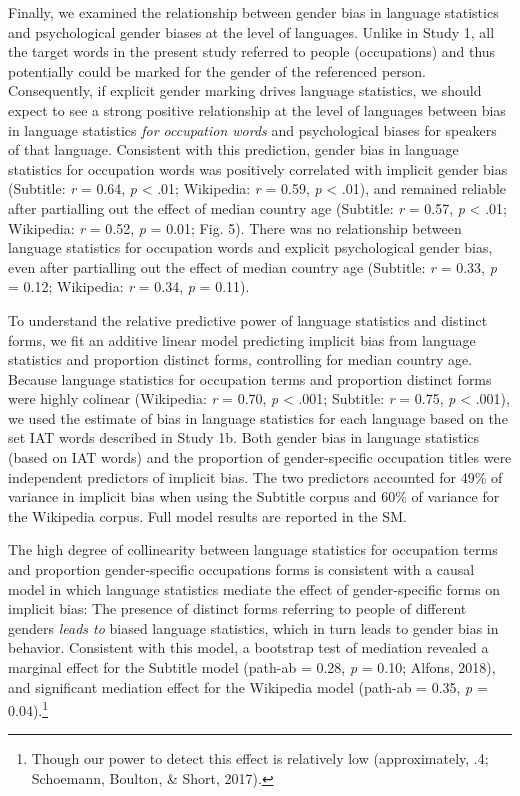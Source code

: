 \documentclass[man,floatsintext]{apa6}
\let\rmarkdownfootnote\footnote%
\def\footnote{\protect\rmarkdownfootnote}
\begin{document}
Finally, we examined the relationship between gender bias in language statistics and psychological gender biases at the level of languages. Unlike in Study 1, all the target words in the present study referred to people (occupations) and thus potentially could be marked for the gender of the referenced person. Consequently, if explicit gender marking drives language statistics, we should expect to see a strong positive relationship at the level of languages between bias in language statistics \emph{for occupation words} and psychological biases for speakers of that language. Consistent with this prediction, gender bias in language statistics for occupation words was positively correlated with implicit gender bias (Subtitle: \emph{r} = 0.64, \emph{p} \textless{} .01; Wikipedia: \emph{r} = 0.59, \emph{p} \textless{} .01), and remained reliable after partialling out the effect of median country age (Subtitle: \emph{r} = 0.57, \emph{p} \textless{} .01; Wikipedia: \emph{r} = 0.52, \emph{p} = 0.01; Fig. 5). There was no relationship between language statistics for occupation words and explicit psychological gender bias, even after partialling out the effect of median country age (Subtitle: \emph{r} = 0.33, \emph{p} = 0.12; Wikipedia: \emph{r} = 0.34, \emph{p} = 0.11).

To understand the relative predictive power of language statistics and distinct forms, we fit an additive linear model predicting implicit bias from language statistics and proportion distinct forms, controlling for median country age. Because language statistics for occupation terms and proportion distinct forms were highly colinear (Wikipedia: \emph{r} = 0.70, \emph{p} \textless{} .001; Subtitle: \emph{r} = 0.75, \emph{p} \textless{} .001), we used the estimate of bias in language statistics for each language based on the set IAT words described in Study 1b. Both gender bias in language statistics (based on IAT words) and the proportion of gender-specific occupation titles were independent predictors of implicit bias. The two predictors accounted for 49\% of variance in implicit bias when using the Subtitle corpus and 60\% of variance for the Wikipedia corpus. Full model results are reported in the SM.

The high degree of collinearity between language statistics for occupation terms and proportion gender-specific occupations forms is consistent with a causal model in which language statistics mediate the effect of gender-specific forms on implicit bias: The presence of distinct forms referring to people of different genders \emph{leads to} biased language statistics, which in turn leads to gender bias in behavior. Consistent with this model, a bootstrap test of mediation revealed a marginal effect for the Subtitle model (path-ab = 0.28, \emph{p} = 0.10; Alfons, 2018), and significant mediation effect for the Wikipedia model (path-ab = 0.35, \emph{p} = 0.04).\footnote{Though our power to detect this effect is relatively low (approximately, .4; Schoemann, Boulton, \& Short, 2017).}
\end{document}
